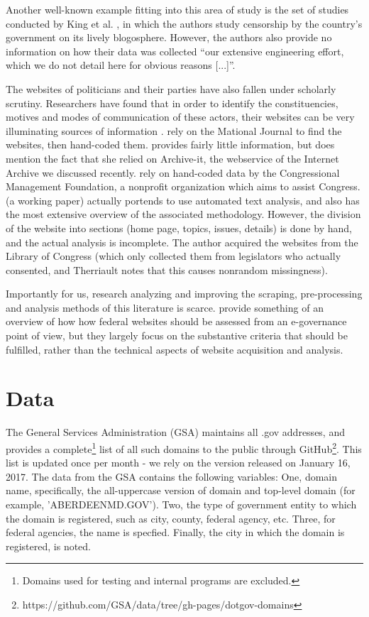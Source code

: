 \documentclass[11pt]{article}
\begin{document}
Another well-known example fitting into this area of study is the set of studies conducted by King et al. \citep{KING2013,King2014,KING2017}, in which the authors study censorship by the country's government on its lively blogosphere. However, the authors also provide no information on how their data was collected ``our extensive engineering effort, which we do not detail here for obvious reasons [...]''.

The websites of politicians and their parties have also fallen under scholarly scrutiny. Researchers have found that in order to identify the constituencies, motives and modes of communication of these actors, their websites can be very illuminating sources of information \citep{Druckman2009,Druckman2010,Cryer2017,Esterling2011,Esterling2011a,Norris2003,Therriault2010}. \cite{Druckman2009,Druckman2010} rely on the Mational Journal to find the websites, then hand-coded them. \cite{Cryer2017} provides fairly little information, but does mention the fact that she relied on Archive-it, the webservice of the Internet Archive we discussed recently. \cite{Esterling2011,Esterling2011a} rely on hand-coded data by the Congressional Management Foundation, a nonprofit organization which aims to assist Congress. \cite{Therriault2010} (a working paper) actually portends to use automated text analysis, and also has the most extensive overview of the associated methodology. However, the division of the website into sections (home page, topics, issues, details) is done by hand, and the actual analysis is incomplete. The author acquired the websites from the Library of Congress (which only collected them from legislators who actually consented, and Therriault notes that this causes nonrandom missingness).

Importantly for us, research analyzing and improving the scraping, pre-processing and analysis methods of this literature is scarce. \cite{Eschenfelder2002} provide something of an overview of how how federal websites should be assessed from an e-governance point of view, but they largely focus on the substantive criteria that should be fulfilled, rather than the technical aspects of website acquisition and analysis.

\section{Data}
The General Services Administration (GSA) maintains all .gov addresses, and provides a complete\footnote{Domains used for testing and internal programs are excluded.} list of all such domains to the public through GitHub\footnote{https://github.com/GSA/data/tree/gh-pages/dotgov-domains}. This list is updated once per month - we rely on the version released on January 16, 2017. The data from the GSA contains the following variables: One, domain name, specifically, the all-uppercase version of domain and top-level domain (for example, 'ABERDEENMD.GOV'). Two, the type of government entity to which the domain is registered, such as city, county, federal agency, etc. Three, for federal agencies, the name is specfied. Finally, the city in which the domain is registered, is noted.
\end{document}
